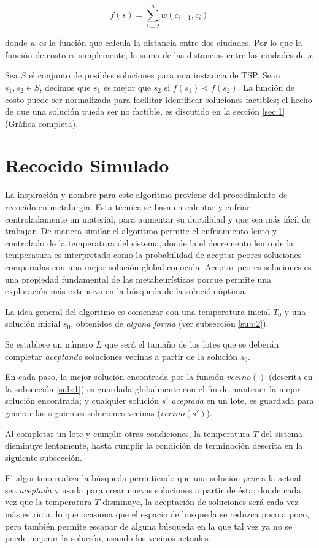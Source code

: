 \documentclass[12pt, letterpaper]{article}
\begin{document}
\begin{equation}
f(s)=\sum_{i=2}^{n}w(c_{i-1}, c_i)    
\end{equation}

donde $w$ es la función que calcula la distancia entre dos ciudades. Por lo que la función de costo es simplemente, la suma de las distancias entre las ciudades de $s$.
\par
Sea $S$ el conjunto de posibles soluciones para una instancia de TSP. Sean $s_1, s_2 \in S$, decimos que $s_1$ es mejor que $s_2$ si $f(s_1) < f(s_2)$. La función de costo puede ser normalizada para facilitar identificar soluciones factibles; el hecho de que una solución pueda ser no factible, es discutido en la sección \ref{sec:1} (Gráfica completa).

\section{Recocido Simulado}

La inspiración y nombre para este algoritmo proviene del procedimiento de recocido en metalurgia. Esta técnica se basa en calentar y enfriar controladamente un material, para aumentar su ductilidad y que sea más fácil de trabajar. De manera similar el algoritmo permite el enfriamiento lento y controlado de la temperatura del sistema, donde la el decremento lento de la temperatura es interpretado como la probabilidad de aceptar peores soluciones comparadas con una mejor solución global conocida. Aceptar peores soluciones es una propiedad fundamental de las metaheurísticas porque permite una exploración más extensiva en la búsqueda de la solución óptima.
\par
La idea general del algoritmo es comenzar con una temperatura inicial $T_0$ y una solución inicial $s_0$, obtenidos de \textit{alguna forma} (ver subsección \ref{sub:2}).
\par
Se establece un número $L$ que será el tamaño de los lotes que se deberán completar \textit{aceptando} soluciones vecinas a partir de la solución $s_0$.
\par
En cada paso, la mejor solución encontrada por la función $vecino()$ (descrita en la subsección \ref{sub:1}) es guardada globalmente con el fin de mantener la mejor solución encontrada; y cualquier solución $s'$ \textit{aceptada} en un lote, es guardada para generar las siguientes soluciones vecinas ($vecino(s')$).
\par
Al completar un lote y cumplir otras condiciones, la temperatura $T$ del sistema disminuye lentamente, hasta cumplir la condición de terminación descrita en la siguiente subsección.
\par
El algoritmo realiza la búsqueda permitiendo que una solución \textit{peor} a la actual sea \textit{aceptada} y usada para crear nuevas soluciones a partir de ésta; donde cada vez que la temperatura $T$ disminuye, la aceptación de soluciones será cada vez más estricta, lo que ocasiona que el espacio de busqueda se reduzca poco a poco, pero también permite escapar de alguna búsqueda en la que tal vez ya no se puede mejorar la solución, usando los vecinos actuales.
\end{document}
